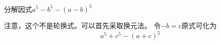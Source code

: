 \documentclass[windows,csize4,answers]{BHCexam}
\begin{document}
\begin{groups}
\begin{questions}[]
        \question[5] 分解因式$a^5-b^5-(a-b)^5$
        \begin{solution}{0.5cm}
            注意，这个不是轮换式。可以首先采取换元法。
            \methodonly 令$-b=c$原式可化为
            \[
                a^5+c^5-(a+c)^5
            \]
        \end{solution}
        \vspace{3.5cm}

    \end{questions}
\end{groups}



\label{lastpage}
\end{document}
